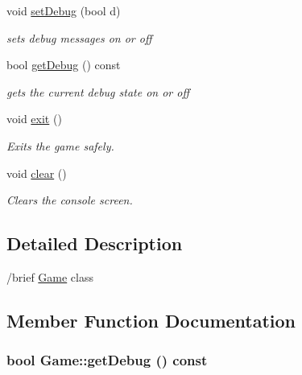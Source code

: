 \begin{DoxyCompactItemize}
void \hyperlink{classGame_afd7159db54f6bf097c54fdb21f9ffdab}{setDebug} (bool d)
\begin{DoxyCompactList}\small\item\em sets debug messages on or off \item\end{DoxyCompactList}\item 
bool \hyperlink{classGame_a12908d0175f34c5fabe2283c2258532d}{getDebug} () const 
\begin{DoxyCompactList}\small\item\em gets the current debug state on or off \item\end{DoxyCompactList}\item 
\hypertarget{classGame_a9726dd4085951bdeae5666ccde07e6e9}{
void \hyperlink{classGame_a9726dd4085951bdeae5666ccde07e6e9}{exit} ()}
\label{classGame_a9726dd4085951bdeae5666ccde07e6e9}

\begin{DoxyCompactList}\small\item\em Exits the game safely. \item\end{DoxyCompactList}\item 
\hypertarget{classGame_a8ba8d7bcda356ed584dc445184320ff7}{
void \hyperlink{classGame_a8ba8d7bcda356ed584dc445184320ff7}{clear} ()}
\label{classGame_a8ba8d7bcda356ed584dc445184320ff7}

\begin{DoxyCompactList}\small\item\em Clears the console screen. \item\end{DoxyCompactList}\end{DoxyCompactItemize}


\subsection{Detailed Description}
/brief \hyperlink{classGame}{Game} class 

\subsection{Member Function Documentation}
\hypertarget{classGame_a12908d0175f34c5fabe2283c2258532d}{
\subsubsection[{getDebug}]{\setlength{\rightskip}{0pt plus 5cm}bool Game::getDebug () const}}
\label{classGame_a12908d0175f34c5fabe2283c2258532d}


